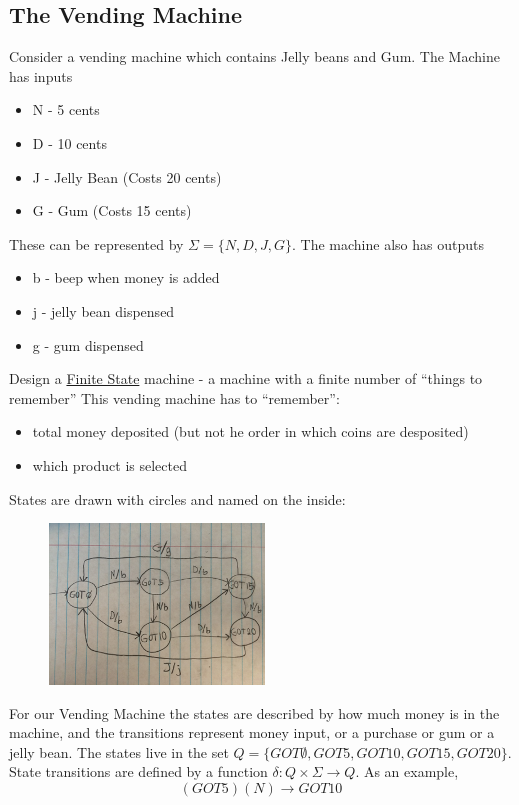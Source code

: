 \documentclass{scrartcl}
\begin{document}
\subsection{The Vending Machine}
Consider a vending machine which contains Jelly beans and Gum. The Machine has inputs
\begin{itemize}
\item N - 5 cents
\item D - 10 cents
\item J - Jelly Bean (Costs 20 cents)
\item G - Gum (Costs 15 cents)
\end{itemize}
These can be represented by $\Sigma=\{N,D,J,G\}$. The machine also has outputs
\begin{itemize}
\item b - beep when money is added
\item j - jelly bean dispensed
\item g - gum dispensed
\end{itemize}
Design a \underline{Finite State} machine - a machine with a finite number of ``things to remember''
This vending machine has to ``remember'':
\begin{itemize}
\item total money deposited (but not he order in which coins are desposited)
\item which product is selected
\end{itemize}
States are drawn with circles and named on the inside:\\

\begin{figure}
\includegraphics{./VMStateDiagram.png}\\
\end{figure}

For our Vending Machine the states are described by how much money is in the machine, and the transitions represent money input, or a purchase or gum or a jelly bean. The states live in the set $Q=\{GOT\emptyset,GOT5,GOT10,GOT15,GOT20\}$.\\ State transitions are defined by a function $\delta: Q\times\Sigma\rightarrow Q$. As an example, 
\begin{displaymath}
(GOT5)(N) \rightarrow GOT10 
\end{displaymath}
\end{document}
